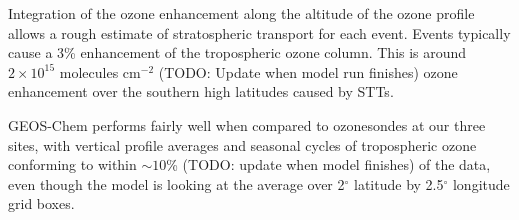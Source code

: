\documentclass{article}
\begin{document}
  Integration of the ozone enhancement along the altitude of the ozone profile allows a rough estimate of stratospheric transport for each event.
  Events typically cause a 3\% enhancement of the tropospheric ozone column.
  This is around $2 \times 10^{15}$ molecules cm$^{-2}$ (TODO: Update when model run finishes) ozone enhancement over the southern high latitudes caused by STTs.
  
  GEOS-Chem performs fairly well when compared to ozonesondes at our three sites, with vertical profile averages and seasonal cycles of tropospheric ozone conforming to within $\sim 10$\% (TODO: update when model finishes) of the data, even though the model is looking at the average over 2$^{\circ}$ latitude by 2.5$^{\circ}$ longitude grid boxes.
  

\end{document}
